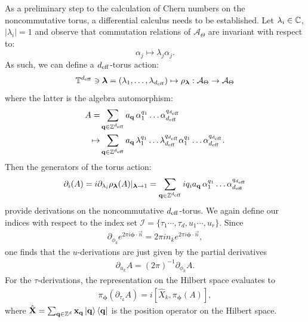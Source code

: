 \documentclass[
    10pt,
    aps,
    prb,
    twocolumn,
    floatfix,
    superscriptaddress,
]{revtex4-2}
\begin{document}
As a preliminary step to the calculation of Chern numbers on the noncommutative torus, a differential calculus needs to be established.
Let $\lambda_i \in {\mathbb C}$, $|\lambda_i| =1$ and observe that commutation relations of $\mathcal{A}_\Theta$ are invariant with respect to:
\begin{equation}
\alpha_j \mapsto \lambda_j \alpha_j.
\end{equation}
As such, we can define a ${d_\mathrm{eff}}$-torus action:
\begin{equation}
{\mathbb T}^{d_\mathrm{eff}} \ni \bm \lambda=(\lambda_1,\ldots,\lambda_{d_\mathrm{eff}}) \mapsto \rho_{\bm \lambda}: \mathcal{A}_\Theta \to \mathcal{A}_\Theta
\end{equation}
where the latter is the algebra automorphism:
\begin{align}
	A =& \sum_{\mathbf{q} \in {\mathbb Z}^{{d_\mathrm{eff}}}} a_{\mathbf{q}}
	\, \alpha_1^{q_1} \ldots\alpha_{d_\mathrm{eff}}^{q_{d_\mathrm{eff}}}
    \notag \\
 \mapsto & 
	\sum_{\mathbf{q} \in {\mathbb Z}^{{d_\mathrm{eff}}}} a_{\mathbf{q}}
	\, 
	\lambda_1^{q_1} \ldots\lambda_{d_\mathrm{eff}}^{q_{d_\mathrm{eff}}}
	\alpha_1^{q_1} \ldots\alpha_{d_\mathrm{eff}}^{q_{d_\mathrm{eff}}} .
\end{align}
Then the generators of the torus action:
\begin{equation}
\partial_i(A) = i \partial_{\lambda_i} \rho_{\bm \lambda}(A)|_{\bm \lambda \rightarrow 1}
=\sum_{\mathbf{q} \in {\mathbb Z}^{{d_\mathrm{eff}}}} i q_i a_{\mathbf{q}}
\, \alpha_1^{q_1} \ldots\alpha_{d_\mathrm{eff}}^{q_{d_\mathrm{eff}}}
\end{equation}
provide derivations on the noncommutative ${d_\mathrm{eff}}$-torus. 
We again define our indices with respect to the index set $\mathcal{I} = \lbrace \tau_1 \cdots, \tau_d, u_1  \cdots, u_r  \rbrace$.
Since
\begin{align}
	\partial_{\phi_k}  e^{2\pi i \boldsymbol{\phi} \cdot \vec{n}} = 2\pi  i n_k  e^{2 \pi i \boldsymbol{\phi} \cdot \vec{n}},
\end{align}
one finds that the $u$-derivations are just given by the partial derivatives
\begin{align}
	\partial_{u_k}  A 
	=  (2\pi)^{-1}\partial_{\phi_k}  A. 
\end{align}
For the $\tau$-derivations, the representation on the Hilbert space evaluates to
\begin{align}
	\pi_{\boldsymbol{\phi}} (\partial_{\tau_k} A) = i [ \hat{X}_k, \pi_{\boldsymbol{\phi}} (A)],
\end{align}
where $\hat{\mathbf{X}} = \sum_{\mathbf{q}\in \mathbb{Z}^d} \mathbf{x}_{\mathbf{q}}\ket{\mathbf{q}} \bra{\mathbf{q}}$ is the position operator on the Hilbert space.
\end{document}
